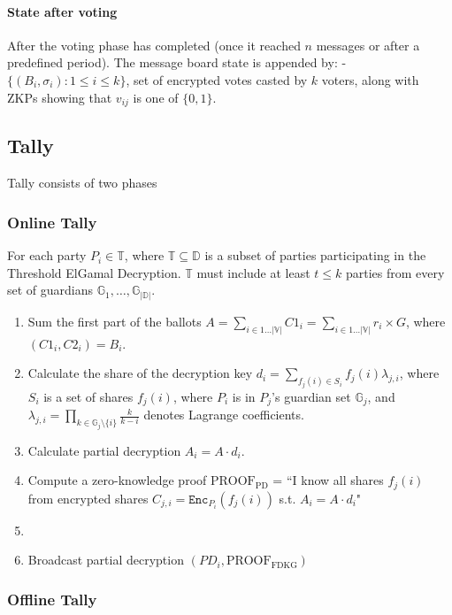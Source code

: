 \documentclass{article}
\begin{document}
\paragraph{State after voting}

After the voting phase has completed (once it reached $n$ messages or after a predefined period). The message board state is appended by:
- $\{(B_{i}, \sigma_i) : 1 \leq i \leq k\}$, set of encrypted votes casted by $k$ voters, along with ZKPs showing that $v_{ij}$ is one of $\{0,1\}$.

\subsection{Tally}

Tally consists of two phases
\subsubsection{Online Tally}

For each party $P_i \in \mathbb{T}$, where $\mathbb{T} \subseteq  \mathbb{D}$ is a subset of parties participating in the Threshold ElGamal Decryption. $\mathbb{T}$ must include at least $t \leq k$ parties from every set of guardians $\mathbb{G}_1,\dots,\mathbb{G}_{|\mathbb{D}|}$.
\begin{enumerate}
    \item Sum the first part of the ballots $A = \sum_{i \in 1 \dots |\mathbb{V}|} C1_i = \sum_{i \in 1 \dots |\mathbb{V}|} r_{i} \times G$, where $(C1_i,C2_i)=B_i$.
    \item  Calculate the share of the decryption key $d_i=\sum_{f_j(i) \in S_i} f_j(i) \lambda_{j,i}$, where $S_i$ is a set of shares $f_j(i)$, where $P_i$ is in $P_j$'s guardian set $\mathbb{G}_j$, and $\lambda_{j,i}=\prod_{k \in \mathbb{G}_j \setminus \{i\}} \frac{k}{k-i}$ denotes Lagrange coefficients. 
    \item Calculate partial decryption $A_i = A \cdot d_i$.
    \item Compute a zero-knowledge proof $\textrm{PROOF}_\textrm{PD}$ = “I know all shares $f_j(i)$ from encrypted shares $C_{j,i}=\texttt{Enc}_{P_i}(f_j(i))$ s.t. $A_i = A \cdot d_i$" 
    \item %
    \item Broadcast partial decryption $(PD_i, \textrm{PROOF}_\textrm{FDKG})$
\end{enumerate}

\subsubsection{Offline Tally}
\end{document}
